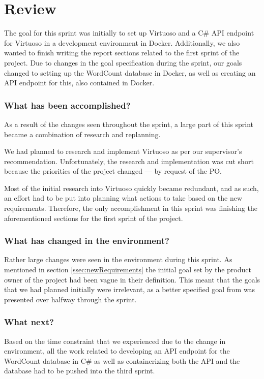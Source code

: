 \section{Review}
The goal for this sprint was initially to set up Virtuoso and a C\# API endpoint for Virtuoso in a development environment in Docker. 
Additionally, we also wanted to finish writing the report sections related to the first sprint of the \knox{} project. 
Due to changes in the goal specification during the sprint, our goals changed to setting up the WordCount database in Docker, as well as creating an API endpoint for this, also contained in Docker.

\subsubsection*{What has been accomplished?}
As a result of the changes seen throughout the sprint, a large part of this sprint became a combination of research and replanning. 

We had planned to research and implement Virtuoso as per our supervisor's recommendation.
Unfortunately, the research and implementation was cut short because the priorities of the \knox{} project changed --- by request of the \knox{} PO.

Most of the initial research into Virtuoso quickly became redundant, and as such, an effort had to be put into planning what actions to take based on the new requirements. 
Therefore, the only accomplishment in this sprint was finishing the aforementioned sections for the first sprint of the \knox{} project.  



\subsubsection*{What has changed in the environment?}
Rather large changes were seen in the environment during this sprint. As mentioned in section \ref{ssec:newRequirements} the initial goal set by the product owner of the \knox{} project had been vague in their definition. 
This meant that the goals that we had planned initially were irrelevant, as a better specified goal from \knox{} was presented over halfway through the sprint. 

\subsubsection*{What next?}
Based on the time constraint that we experienced due to the change in environment, all the work related to developing an API endpoint for the WordCount database in C\# as well as containerizing both the API and the database had to be pushed into the third sprint.
